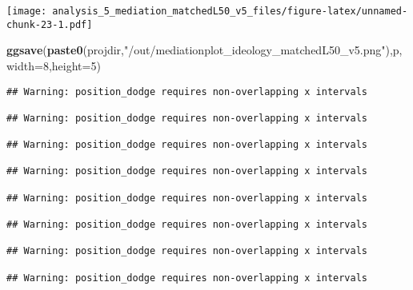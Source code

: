 \documentclass[
]{article}
\newenvironment{Shaded}{\begin{snugshade}}{\end{snugshade}}
\newcommand{\DataTypeTok}[1]{\textcolor[rgb]{0.13,0.29,0.53}{#1}}
\newcommand{\DecValTok}[1]{\textcolor[rgb]{0.00,0.00,0.81}{#1}}
\newcommand{\KeywordTok}[1]{\textcolor[rgb]{0.13,0.29,0.53}{\textbf{#1}}}
\newcommand{\NormalTok}[1]{#1}
\newcommand{\StringTok}[1]{\textcolor[rgb]{0.31,0.60,0.02}{#1}}
\begin{document}
\texttt{[image: analysis\_5\_mediation\_matchedL50\_v5\_files/figure-latex/unnamed-chunk-23-1.pdf]}

\begin{Shaded}
\begin{Highlighting}[]
\KeywordTok{ggsave}\NormalTok{(}\KeywordTok{paste0}\NormalTok{(projdir,}\StringTok{"/out/mediationplot_ideology_matchedL50_v5.png"}\NormalTok{),p,}\DataTypeTok{width=}\DecValTok{8}\NormalTok{,}\DataTypeTok{height=}\DecValTok{5}\NormalTok{)}
\end{Highlighting}
\end{Shaded}

\begin{verbatim}
## Warning: position_dodge requires non-overlapping x intervals

## Warning: position_dodge requires non-overlapping x intervals

## Warning: position_dodge requires non-overlapping x intervals

## Warning: position_dodge requires non-overlapping x intervals

## Warning: position_dodge requires non-overlapping x intervals

## Warning: position_dodge requires non-overlapping x intervals

## Warning: position_dodge requires non-overlapping x intervals

## Warning: position_dodge requires non-overlapping x intervals
\end{verbatim}
\end{document}
